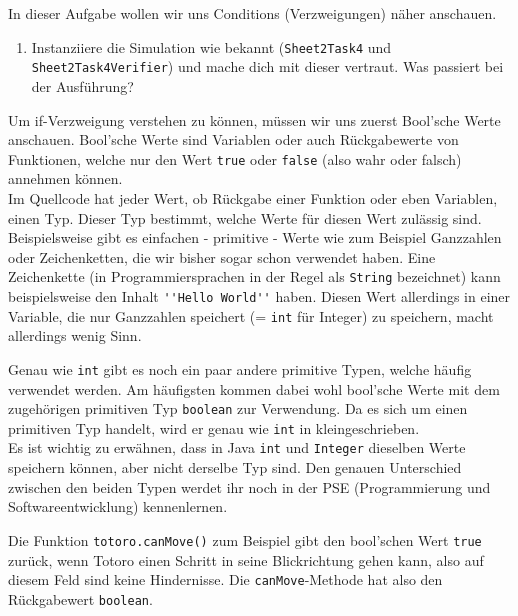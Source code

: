 

In dieser Aufgabe wollen wir uns Conditions (Verzweigungen) näher anschauen.

\begin{enumerate}                           
    \item Instanziiere die Simulation wie bekannt (\lstinline{Sheet2Task4} und \lstinline{Sheet2Task4Verifier}) und mache dich mit dieser vertraut.
        Was passiert bei der Ausführung?
\end{enumerate}

\begin{Infobox}
    Um if-Verzweigung verstehen zu können, müssen wir uns zuerst Bool'sche Werte anschauen. Bool'sche Werte sind Variablen oder auch Rückgabewerte von Funktionen, welche nur den Wert \lstinline{true} oder \lstinline{false} (also wahr oder falsch) annehmen können. \\
Im Quellcode hat jeder Wert, ob Rückgabe einer Funktion oder eben Variablen, einen Typ.
Dieser Typ bestimmt, welche Werte für diesen Wert zulässig sind.
Beispielsweise gibt es einfachen - primitive - Werte wie zum Beispiel Ganzzahlen oder Zeichenketten, die wir bisher sogar schon verwendet haben.
Eine Zeichenkette (in Programmiersprachen in der Regel als \lstinline{String} bezeichnet) kann beispielsweise den Inhalt \lstinline{''Hello World''} haben.
Diesen Wert allerdings in einer Variable, die nur Ganzzahlen speichert (= \lstinline{int} für Integer) zu speichern, macht allerdings wenig Sinn.

Genau wie \lstinline{int} gibt es noch ein paar andere primitive Typen, welche häufig verwendet werden.
Am häufigsten kommen dabei wohl bool'sche Werte mit dem zugehörigen primitiven Typ \lstinline{boolean} zur Verwendung.
Da es sich um einen primitiven Typ handelt, wird er genau wie \lstinline{int} in kleingeschrieben.\\

Es ist wichtig zu erwähnen, dass in Java \lstinline{int} und \lstinline{Integer} dieselben Werte speichern können, aber nicht derselbe Typ sind.
Den genauen Unterschied zwischen den beiden Typen werdet ihr noch in der PSE (Programmierung und Softwareentwicklung) kennenlernen.

Die Funktion \lstinline{totoro.canMove()} zum Beispiel gibt den bool'schen Wert \lstinline{true} zurück, wenn Totoro einen Schritt in seine Blickrichtung gehen kann, also auf diesem Feld sind keine Hindernisse.
Die \lstinline{canMove}-Methode hat also den Rückgabewert \lstinline{boolean}.
    
\end{Infobox}

